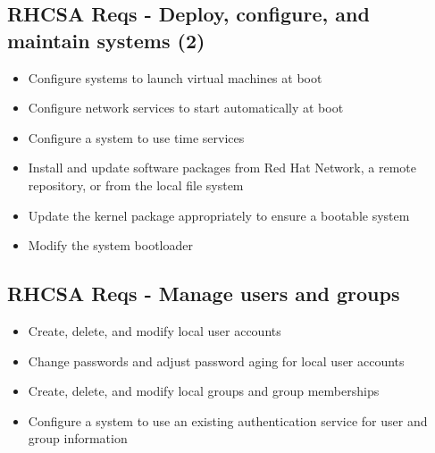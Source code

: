 \documentclass[letterpaper,10pt,english]{sphinxmanual}
\begin{document}
\subsection{RHCSA Reqs - Deploy, configure, and maintain systems (2)}
\label{intro:rhcsa-reqs-deploy-configure-and-maintain-systems-2}\begin{itemize}
\item {} 
Configure systems to launch virtual machines at boot

\item {} 
Configure network services to start automatically at boot

\item {} 
Configure a system to use time services

\item {} 
Install and update software packages from Red Hat Network, a remote repository, or from the local file system

\item {} 
Update the kernel package appropriately to ensure a bootable system

\item {} 
Modify the system bootloader

\end{itemize}


\subsection{RHCSA Reqs - Manage users and groups}
\label{intro:rhcsa-reqs-manage-users-and-groups}\begin{itemize}
\item {} 
Create, delete, and modify local user accounts

\item {} 
Change passwords and adjust password aging for local user accounts

\item {} 
Create, delete, and modify local groups and group memberships

\item {} 
Configure a system to use an existing authentication service for user and group information

\end{itemize}
\end{document}
